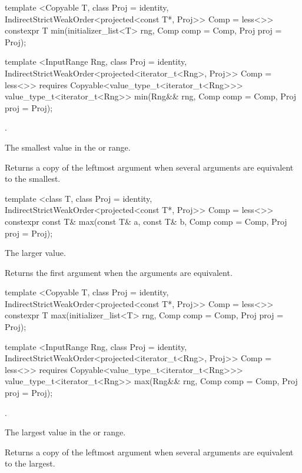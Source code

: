 %
\begin{itemdecl}
template <Copyable T, class Proj = identity,
    IndirectStrictWeakOrder<projected<const T*, Proj>> Comp = less<>>
  constexpr T min(initializer_list<T> rng, Comp comp = Comp{}, Proj proj = Proj{});

template <InputRange Rng, class Proj = identity,
    IndirectStrictWeakOrder<projected<iterator_t<Rng>, Proj>> Comp = less<>>
  requires Copyable<value_type_t<iterator_t<Rng>>>
  value_type_t<iterator_t<Rng>>
    min(Rng&& rng, Comp comp = Comp{}, Proj proj = Proj{});
\end{itemdecl}

\begin{itemdescr}
\pnum
\requires {}.

\pnum
\returns The smallest value in the  or range.

\pnum
\remarks Returns a copy of the leftmost argument when several arguments are equivalent to the smallest.
\end{itemdescr}

%
\begin{itemdecl}
template <class T, class Proj = identity,
    IndirectStrictWeakOrder<projected<const T*, Proj>> Comp = less<>>
  constexpr const T& max(const T& a, const T& b, Comp comp = Comp{}, Proj proj = Proj{});
\end{itemdecl}

\begin{itemdescr}
\pnum
\returns
The larger value.

\pnum
\notes
Returns the first argument when the arguments are equivalent.
\end{itemdescr}

%
\begin{itemdecl}
template <Copyable T, class Proj = identity,
    IndirectStrictWeakOrder<projected<const T*, Proj>> Comp = less<>>
  constexpr T max(initializer_list<T> rng, Comp comp = Comp{}, Proj proj = Proj{});

template <InputRange Rng, class Proj = identity,
    IndirectStrictWeakOrder<projected<iterator_t<Rng>, Proj>> Comp = less<>>
  requires Copyable<value_type_t<iterator_t<Rng>>>
  value_type_t<iterator_t<Rng>>
    max(Rng&& rng, Comp comp = Comp{}, Proj proj = Proj{});
\end{itemdecl}

\begin{itemdescr}
\pnum
\requires {}.

\pnum
\returns The largest value in the  or range.

\pnum
\remarks Returns a copy of the leftmost argument when several arguments are equivalent to the largest.
\end{itemdescr}

